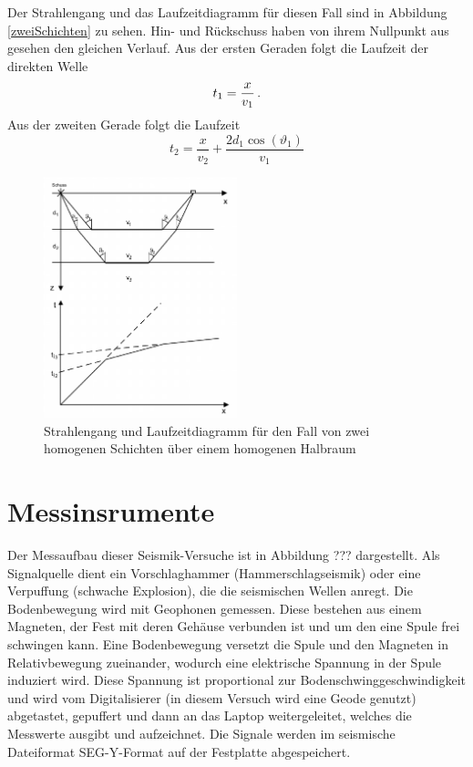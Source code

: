 Der Strahlengang und das Laufzeitdiagramm für diesen Fall sind in Abbildung \ref{zweiSchichten} zu sehen. Hin- und Rückschuss haben von ihrem Nullpunkt aus gesehen den gleichen Verlauf. Aus der ersten Geraden folgt die Laufzeit der direkten Welle
\begin{equation}
 t_1=\frac{x}{v_1} \text{\,.}
\end{equation}
Aus der zweiten Gerade folgt die Laufzeit
\begin{equation}
 t_2=\frac{x}{v_2}+\frac{2d_1\cos(\vartheta_1)}{v_1}
\end{equation}


\begin{figure}
 \centering
 \includegraphics[width=0.5\textwidth]{fig/zweischichten}
 \caption[Strahlengang und Laufzeitdiagramm für den Fall von zwei homogenen Schichten über einem homogenen Halbraum]{Strahlengang und Laufzeitdiagramm für den Fall von zwei homogenen Schichten über einem homogenen Halbraum \cite{skript}}
 \label{fig:zweiSchichten}
\end{figure}

\section{Messinsrumente}

Der Messaufbau dieser Seismik-Versuche ist in Abbildung ??? dargestellt. Als Signalquelle dient ein Vorschlaghammer (Hammerschlagseismik) oder eine Verpuffung (schwache Explosion), die die seismischen Wellen anregt. Die Bodenbewegung wird mit Geophonen gemessen. Diese bestehen aus einem Magneten, der Fest mit deren Gehäuse verbunden ist und um den eine Spule frei schwingen kann. Eine Bodenbewegung versetzt die Spule und den Magneten in Relativbewegung zueinander, wodurch eine elektrische Spannung in der Spule induziert wird. Diese Spannung ist proportional zur Bodenschwinggeschwindigkeit und wird vom Digitalisierer (in diesem Versuch wird eine Geode genutzt) abgetastet, gepuffert und dann an das Laptop weitergeleitet, welches die Messwerte ausgibt und aufzeichnet. Die Signale werden im seismische Dateiformat SEG-Y-Format auf der Festplatte abgespeichert.


